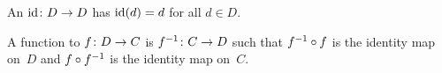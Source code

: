 \documentclass{test}  %
\begin{document}
\begin{problem}
\end{problem}

\begin{df}
An  $\mbox{$\operatorname{id}\colon D\to D$}$ has
$\operatorname{id}(d)=d$ for all $d\in D$.
\end{df}

\begin{df}
A function  to $\mbox{$f\colon D\to C$}$ is 
$\mbox{$f^{-1}\colon C\to D$}$ such that 
$f^{-1}\mathbin{\circ} f$ is the identity map on~$D$ and
$f\mathbin{\circ} f^{-1}$ is the identity map on~$C$.
\end{df}
\end{document}
